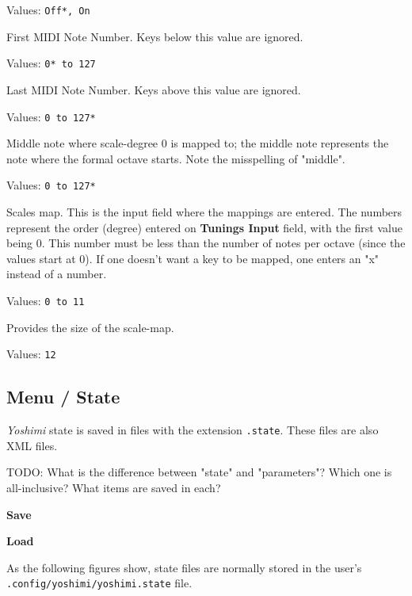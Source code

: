    \setcounter{ItemCounter}{0}      %


   Values: \texttt{Off*, On}

   First MIDI Note Number.
   Keys below this value are ignored.

   Values: \texttt{0* to 127}

   Last MIDI Note Number.
   Keys above this value are ignored.

   Values: \texttt{0 to 127*}

   Middle note where scale-degree 0 is mapped to;
   the middle note represents the note where the formal octave starts.
   Note the misspelling of "middle".

   Values: \texttt{0 to 127*}

   Scales map.  This is the input field where the mappings are entered.
   The numbers represent the order (degree) entered on
   \textbf{Tunings Input} field, with the first value being 0.
   This number must be less than the number of notes per octave (since
   the values start at 0).
   If one doesn't want a key to be mapped, one enters an "x" instead of a
   number.

   Values: \texttt{0 to 11}

   Provides the size of the scale-map.

   Values: \texttt{12}

\subsection{Menu / State}
\label{subsec:menu_state}

   \textsl{Yoshimi} state is saved in files with the extension
   \texttt{.state}.  These files are also XML files.

   TODO: What is the difference between "state" and "parameters"?
   Which one is all-inclusive?  What items are saved in each?

   \begin{enumber}
      \item \textbf{Save}
      \item \textbf{Load}
   \end{enumber}

   As the following figures show, state files are normally stored in the
   user's \texttt{.config/yoshimi/yoshimi.state} file.

